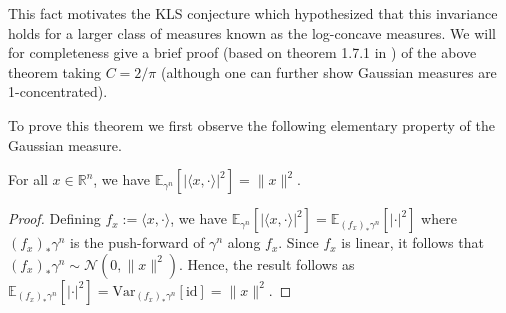 This fact motivates the KLS conjecture which hypothesized that 
this invariance holds for a larger class of measures known as the log-concave measures. We will 
for completeness give a brief proof (based on theorem 1.7.1 in \cite{Bogachev_1998}) of the above theorem taking \(C = 2 / \pi\) 
(although one can further show Gaussian measures are 1-concentrated).

To prove this theorem we first observe the following elementary property of the Gaussian measure.

\begin{lemma}\label{lem:gaussian_inner}
  For all \(x \in \mathbb{R}^n\), we have 
  \(\mathbb{E}_{\gamma^n}[|\langle x, \cdot \rangle|^2] = \|x\|^2\).
\end{lemma}
\begin{proof}
  Defining \(f_x := \langle x, \cdot \rangle\), we have 
  \(\mathbb{E}_{\gamma^n}[|\langle x, \cdot \rangle|^2] = \mathbb{E}_{(f_x)_* \gamma^n}[|\cdot |^2]\) where 
  \((f_x)_* \gamma^n\) is the push-forward of \(\gamma^n\) along \(f_x\). Since \(f_x\) is linear, it follows 
  that \((f_x)_* \gamma^n \sim \mathcal{N}(0, \|x\|^2)\). Hence, the result follows as 
  \(\mathbb{E}_{(f_x)_* \gamma^n}[|\cdot |^2] = \text{Var}_{(f_x)_* \gamma^n}[\text{id}] = \|x\|^2\).
\end{proof}

